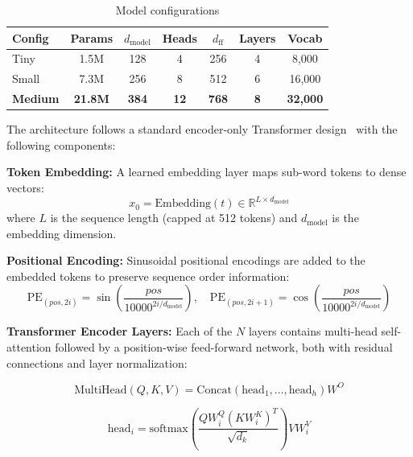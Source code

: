 \documentclass[conference,compsoc]{IEEEtran}
\begin{document}
\begin{table}[h]
\centering
\caption{Model configurations}
\label{tab:configs}
\begin{tabular}{lcccccc}
\toprule
\textbf{Config} & \textbf{Params} & \textbf{$d_{\text{model}}$} & \textbf{Heads} & \textbf{$d_{\text{ff}}$} & \textbf{Layers} & \textbf{Vocab} \\
\midrule
Tiny & 1.5M & 128 & 4 & 256 & 4 & 8,000 \\
Small & 7.3M & 256 & 8 & 512 & 6 & 16,000 \\
\textbf{Medium} & \textbf{21.8M} & \textbf{384} & \textbf{12} & \textbf{768} & \textbf{8} & \textbf{32,000} \\
\bottomrule
\end{tabular}
\end{table}

The architecture follows a standard encoder-only Transformer design~\cite{vaswani2017} with the following components:

\textbf{Token Embedding:} A learned embedding layer maps sub-word tokens to dense vectors:
\begin{equation}
x_0 = \text{Embedding}(t) \in \mathbb{R}^{L \times d_{\text{model}}}
\end{equation}
where $L$ is the sequence length (capped at 512 tokens) and $d_{\text{model}}$ is the embedding dimension.

\textbf{Positional Encoding:} Sinusoidal positional encodings are added to the embedded tokens to preserve sequence order information:
\begin{equation}
\text{PE}_{(pos,2i)} = \sin\left(\frac{pos}{10000^{2i/d_{\text{model}}}}\right), \quad \text{PE}_{(pos,2i+1)} = \cos\left(\frac{pos}{10000^{2i/d_{\text{model}}}}\right)
\end{equation}

\textbf{Transformer Encoder Layers:} Each of the $N$ layers contains multi-head self-attention followed by a position-wise feed-forward network, both with residual connections and layer normalization:

\begin{equation}
\text{MultiHead}(Q,K,V) = \text{Concat}(\text{head}_1, \dots, \text{head}_h)W^O
\end{equation}

\begin{equation}
\text{head}_i = \text{softmax}\left(\frac{QW_i^Q (KW_i^K)^T}{\sqrt{d_k}}\right) VW_i^V
\end{equation}
\end{document}
